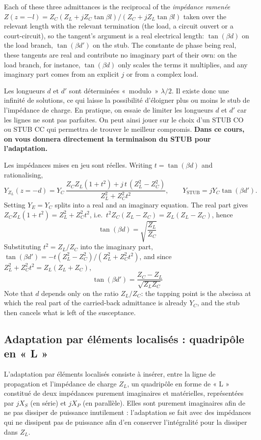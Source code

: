 \begin{remark}
  Each of these three admittances is the reciprocal of the \textit{impédance ramenée}
  $Z(z=-l) = Z_C (Z_L + jZ_C\tan\beta l)/(Z_C + jZ_L\tan\beta l)$ taken over the
  relevant length with the relevant termination (the load, a circuit ouvert or a
  court-circuit), so the tangent's argument is a real electrical length:
  $\tan(\beta d)$ on the load branch, $\tan(\beta d')$ on the stub. The constante de
  phase being real, these tangents are real and contribute no imaginary part of their
  own: on the load branch, for instance, $\tan(\beta d)$ only scales the terms it
  multiplies, and any imaginary part comes from an explicit $j$ or from a complex load.
\end{remark}

\begin{remark}
  Les longueurs $d$ et $d'$ sont déterminées «~modulo~» $\lambda/2$. Il existe donc
  une infinité de solutions, ce qui laisse la possibilité d'éloigner plus ou moins le
  stub de l'impédance de charge. En pratique, on essaie de limiter les longueurs $d$ et
  $d'$ car les lignes ne sont pas parfaites. On peut ainsi jouer sur le choix d'un STUB
  CO ou STUB CC qui permettra de trouver le meilleur compromis. \textbf{Dans ce cours,
  on vous donnera directement la terminaison du STUB pour l'adaptation.}
\end{remark}

\begin{example}
  Les impédances mises en jeu sont réelles. Writing $t = \tan(\beta d)$ and
  rationalising,
  \[Y_{Z_L}(z=-d) = Y_C\,\frac{Z_C Z_L (1+t^2) + j\,t\,(Z_L^2 - Z_C^2)}{Z_L^2 + Z_C^2 t^2},
    \qquad Y_{\text{STUB}} = j Y_C \tan(\beta d').\]
  Setting $Y_E = Y_C$ splits into a real and an imaginary equation. The real part gives
  $Z_C Z_L(1+t^2) = Z_L^2 + Z_C^2 t^2$, i.e.\ $t^2 Z_C(Z_L - Z_C) = Z_L(Z_L - Z_C)$, hence
  \[\boxed{\;\tan(\beta d) = \sqrt{\frac{Z_L}{Z_C}}\;}\]
  Substituting $t^2 = Z_L/Z_C$ into the imaginary part,
  $\tan(\beta d') = -t(Z_L^2-Z_C^2)/(Z_L^2 + Z_C^2 t^2)$, and since
  $Z_L^2 + Z_C^2 t^2 = Z_L(Z_L + Z_C)$,
  \[\boxed{\;\tan(\beta d') = \frac{Z_C - Z_L}{\sqrt{Z_L Z_C}}\;}\]
  Note that $d$ depends only on the ratio $Z_L/Z_C$: the tapping point is the abscissa
  at which the real part of the carried-back admittance is already $Y_C$, and the stub
  then cancels what is left of the susceptance.
\end{example}

\subsection{Adaptation par éléments localisés : quadripôle en « L »}
L'adaptation par éléments localisés consiste à insérer, entre la ligne de propagation
et l'impédance de charge $Z_L$, un quadripôle en forme de « L » constitué de deux
impédances purement imaginaires et matérielles, représentées par $jX_S$ (en série) et
$jX_P$ (en parallèle). Elles sont purement imaginaires afin de ne pas dissiper de
puissance inutilement : l'adaptation se fait avec des impédances qui ne dissipent pas
de puissance afin d'en conserver l'intégralité pour la dissiper dans $Z_L$.

